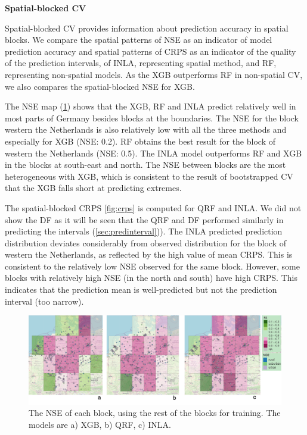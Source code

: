 \documentclass{article}
\begin{document}
\noindent \textbf{Spatial-blocked CV}

Spatial-blocked CV provides information about prediction accuracy in spatial blocks. 
We compare the spatial patterns of NSE as an indicator of model prediction accuracy and spatial patterns of CRPS as an indicator of the quality of the prediction intervals, of INLA, representing spatial method, and RF, representing non-spatial models. As the XGB outperforms RF in non-spatial CV, we also compares the spatial-blocked NSE for XGB. 

The NSE map (\cref{fig:r2}) shows that the XGB, RF and INLA predict relatively well in most parts of Germany besides blocks at the boundaries. The NSE for the block western the Netherlands is also relatively low with all the three methods and especially for XGB (NSE: 0.2). RF obtains the best result for the block of western the Netherlands (NSE: 0.5). The INLA model outperforms RF and XGB in the blocks at south-east and north. The NSE between blocks are the most heterogeneous with XGB, which is consistent to the result of bootstrapped CV that the XGB falls short at predicting extremes.  

The spatial-blocked CRPS \cref{fig:crps} is computed for QRF and INLA. We did not show the DF as it will be seen that the QRF and DF performed similarly in predicting the intervals (\cref{sec:predinterval})). The INLA predicted prediction distribution deviates considerably from observed distribution for the block of western the Netherlands, as reflected by the high value of mean CRPS. This is consistent to the relatively low NSE observed for the same block. However, some blocks with relatively high NSE (in the north and south) have high CRPS. This indicates that the prediction mean is well-predicted but not the prediction interval (too narrow). 

\begin{figure}
    \centering
    \includegraphics[scale=0.4]{fig/r2spcv.png}
    \caption{The NSE of each block, using the rest of the blocks for training. The models are a) XGB, b) QRF, c) INLA. 
}
    \label{fig:r2}
\end{figure}
\end{document}
